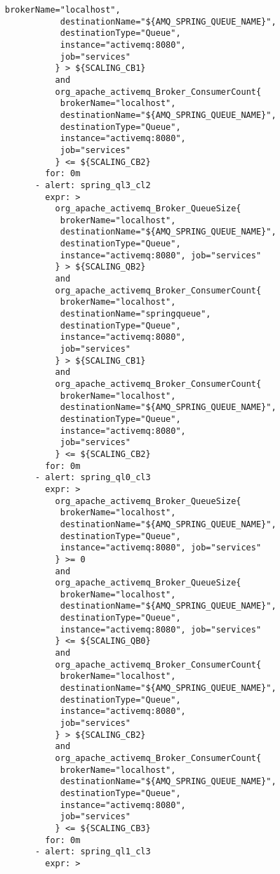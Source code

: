 \begin{lstlisting}[style=bashStyle,caption={alert-unparsed.yml},label=lst:alert-unparsed]
           brokerName="localhost",
           destinationName="${AMQ_SPRING_QUEUE_NAME}", 
           destinationType="Queue",
           instance="activemq:8080", 
           job="services"
          } > ${SCALING_CB1}
          and
          org_apache_activemq_Broker_ConsumerCount{
           brokerName="localhost",
           destinationName="${AMQ_SPRING_QUEUE_NAME}", 
           destinationType="Queue",
           instance="activemq:8080", 
           job="services"
          } <= ${SCALING_CB2}
        for: 0m
      - alert: spring_ql3_cl2
        expr: >
          org_apache_activemq_Broker_QueueSize{
           brokerName="localhost", 
           destinationName="${AMQ_SPRING_QUEUE_NAME}",
           destinationType="Queue", 
           instance="activemq:8080", job="services"
          } > ${SCALING_QB2}
          and 
          org_apache_activemq_Broker_ConsumerCount{
           brokerName="localhost",
           destinationName="springqueue", 
           destinationType="Queue",
           instance="activemq:8080", 
           job="services"
          } > ${SCALING_CB1}
          and
          org_apache_activemq_Broker_ConsumerCount{
           brokerName="localhost",
           destinationName="${AMQ_SPRING_QUEUE_NAME}", 
           destinationType="Queue",
           instance="activemq:8080", 
           job="services"
          } <= ${SCALING_CB2}
        for: 0m
      - alert: spring_ql0_cl3
        expr: >
          org_apache_activemq_Broker_QueueSize{
           brokerName="localhost", 
           destinationName="${AMQ_SPRING_QUEUE_NAME}",
           destinationType="Queue", 
           instance="activemq:8080", job="services"
          } >= 0
          and 
          org_apache_activemq_Broker_QueueSize{
           brokerName="localhost", 
           destinationName="${AMQ_SPRING_QUEUE_NAME}",
           destinationType="Queue", 
           instance="activemq:8080", job="services"
          } <= ${SCALING_QB0}
          and 
          org_apache_activemq_Broker_ConsumerCount{
           brokerName="localhost",
           destinationName="${AMQ_SPRING_QUEUE_NAME}", 
           destinationType="Queue",
           instance="activemq:8080", 
           job="services"
          } > ${SCALING_CB2}
          and
          org_apache_activemq_Broker_ConsumerCount{
           brokerName="localhost",
           destinationName="${AMQ_SPRING_QUEUE_NAME}", 
           destinationType="Queue",
           instance="activemq:8080", 
           job="services"
          } <= ${SCALING_CB3}
        for: 0m
      - alert: spring_ql1_cl3
        expr: >

\end{lstlisting}
